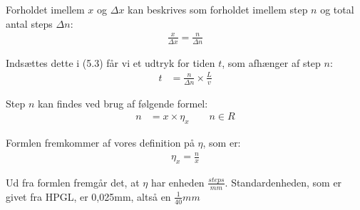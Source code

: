 Forholdet imellem $x$ og $\Delta x$ kan beskrives som forholdet imellem step $n$ og total antal steps $\Delta n$:
\begin{align}
\frac{x}{\Delta x} = \frac{n}{\Delta n}
\end{align}

Indsættes dette i (5.3) får vi et udtryk for tiden $t$, som afhænger af step $n$:
\begin{align}
t &= \frac{n}{\Delta n} \times \frac{L}{v}
\end{align}

Step $n$ kan findes ved brug af følgende formel:
\begin{align}
n &= x \times \eta_x \qquad n \in{R}
\end{align}

Formlen fremkommer af vores definition på $\eta$, som er:
\begin{align*}
\eta_x = \frac{n}{x}
\end{align*}

Ud fra formlen fremgår det, at $\eta$ har enheden $\frac{steps}{mm}$.
Standardenheden, som er givet fra HPGL, er 0,025mm, altså en $\frac{1}{40}mm$


